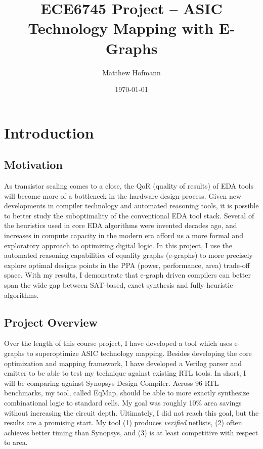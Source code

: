 \documentclass[10pt,letterpaper]{article}
\title{ECE6745 Project -- ASIC Technology Mapping with E-Graphs}
\author{Matthew Hofmann}
\date{\today}
\newcommand{\shortname}{EqMap}
\begin{document}
\maketitle


\section{Introduction}\label{sec:intro}
\subsection{Motivation}\label{sec:intro:motivation}

As transistor scaling comes to a close, the QoR (quality of results) of EDA
tools will become more of a bottleneck in the hardware design process. Given
new developments in compiler technology and automated reasoning tools, it is
possible to better study the suboptimality of the conventional EDA tool stack.
Several of the heuristics used in core EDA algorithms were invented decades
ago, and increases in compute capacity in the modern era afford us a more
formal and exploratory approach to optimizing digital logic. In this project, I
use the automated reasoning capabilities of equality graphs (e-graphs) to more
precisely explore optimal designs points in the PPA (power, performance, area)
trade-off space. With my results, I demonstrate that e-graph driven compilers
can better span the wide gap between SAT-based, exact synthesis and fully
heuristic algorithms.

\subsection{Project Overview}\label{sec:intro:proposal}

Over the length of this course project, I have developed a tool which uses
e-graphs to superoptimize ASIC technology mapping. Besides developing the core
optimization and mapping framework, I have developed a Verilog parser and
emitter to be able to test my technique against existing RTL tools. In short, I
will be comparing against Synopsys Design Compiler. Across 96 RTL benchmarks,
my tool, called \shortname{}, should be able to more exactly synthesize
combinational logic to standard cells. My goal was roughly 10\% area savings
without increasing the circuit depth. Ultimately, I did not reach this goal,
but the results are a promising start. My tool (1) produces \textit{verified}
netlists, (2) often achieves better timing than Synopsys, and (3) is at least
competitive with respect to area.
\end{document}
